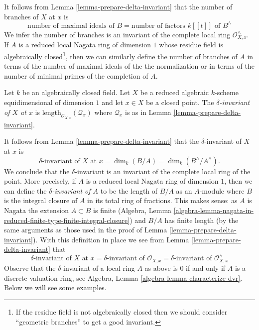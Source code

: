 \noindent
It follows from Lemma \ref{lemma-prepare-delta-invariant}
that the number of branches of $X$ at $x$ is
$$
\text{number of maximal ideals of }B =
\text{number of factors }k[[t]]\text{ of }B^\wedge
$$
We infer the number of branches is an invariant
of the complete local ring $\mathcal{O}_{X, x}^\wedge$.
If $A$ is a reduced local Nagata ring of dimension $1$
whose residue field is algebraically closed\footnote{If the
residue field is not algebraically closed then we should
consider ``geometric branches'' to get a good invariant.}, then we can
similarly define the number of branches of $A$ in terms
of the number of maximal ideals of the the normalization
or in terms of the number of minimal primes of the
completion of $A$.

\begin{definition}
\label{definition-delta-invariant}
Let $k$ be an algebraically closed field.
Let $X$ be a reduced algebraic $k$-scheme equidimensional of
dimension $1$ and let $x \in X$ be a
closed point. The {\it $\delta$-invariant of $X$ at $x$} is
$\text{length}_{\mathcal{O}_{X, x}}(\mathcal{Q}_x)$ where
$\mathcal{Q}_x$ is as in Lemma \ref{lemma-prepare-delta-invariant}.
\end{definition}

\noindent
It follows from Lemma \ref{lemma-prepare-delta-invariant}
that the $\delta$-invariant of $X$ at $x$ is
$$
\delta\text{-invariant of }X\text{ at }x =
\dim_k(B/A) = \dim_k(B^\wedge/A^\wedge).
$$
We conclude that the $\delta$-invariant is an invariant
of the complete local ring of the point. More precisely,
if $A$ is a reduced local Nagata ring of dimension $1$, then
we can define the {\it $\delta$-invariant of $A$} to be the length
of $B/A$ as an $A$-module where $B$ is the integral closure of $A$
in its total ring of fractions. This makes sense: as $A$ is Nagata
the extension $A \subset B$ is finite
(Algebra, Lemma
\ref{algebra-lemma-nagata-in-reduced-finite-type-finite-integral-closure})
and $B/A$ has finite length (by the same arguments as those used in the
proof of
Lemma \ref{lemma-prepare-delta-invariant}).
With this definition in place we see from
Lemma \ref{lemma-prepare-delta-invariant}
that
$$
\delta\text{-invariant of }X\text{ at }x =
\delta\text{-invariant of }\mathcal{O}_{X, x} =
\delta\text{-invariant of }\mathcal{O}_{X, x}^\wedge
$$
Observe that the $\delta$-invariant of a local ring $A$ as above
is $0$ if and only if $A$ is a discrete valuation ring, see
Algebra, Lemma \ref{algebra-lemma-characterize-dvr}.
Below we will see some examples.

